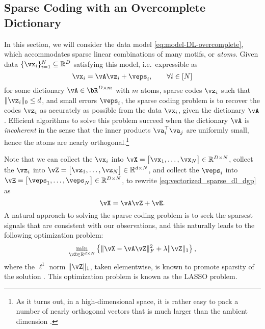 \documentclass[../../book-main.tex]{subfiles}
\begin{document}
\subsection{Sparse Coding with an Overcomplete Dictionary} 

In this section, we will consider the data model
\eqref{eq:model-DL-overcomplete}, which accommodates sparse linear combinations
of many motifs, or \textit{atoms}. Given data \(\{\vx_{i}\}_{i = 1}^{N} \subseteq
\R^{D}\) satisfying this model, i.e.\ expressible as
\begin{equation}\label{eq:vectorized_sparse_dl_dgp}
    \vx_{i} = \vA\vz_{i} + \veps_{i}, \qquad \forall i \in [N]
\end{equation}
for some dictionary $\vA \in \bR^{D \times m}$ with $m$ atoms, sparse codes
$\vz_i$ such that $\norm{\vz_i}_0 \leq d$, and small errors $\veps_i$,
the sparse coding problem is to recover the codes $\vz_i$ as accurately as
possible from the data $\vx_i$, given the dictionary $\vA$.
Efficient algorithms to solve this problem succeed when
the dictionary \(\vA\) is \textit{incoherent} in the sense that the inner
products \(\va_{i}^{\top}\va_{j}\) are uniformly small, hence the atoms are
nearly orthogonal.\footnote{As it turns out, in a high-dimensional space, it is
rather easy to pack a number of nearly orthogonal vectors that is much larger
than the ambient dimension \cite{Wright-Ma-2022}. } 


Note that we can collect the \(\vx_{i}\) into \(\vX = \mat{\vx_{1}, \dots, \vx_{N}} \in \R^{D \times N}\), collect the \(\vz_{i}\) into \(\vZ = \mat{\vz_{1}, \dots, \vz_{N}} \in \R^{d  \times N}\), and collect the \(\veps_{i}\) into \(\vE = \mat{\veps_{1}, \dots, \veps_{N}} \in \R^{D \times N}\), to rewrite \eqref{eq:vectorized_sparse_dl_dgp} as 
\begin{equation}\label{eq:sparse_dl_dgp}
    \vX = \vA\vZ + \vE.
\end{equation}
A natural approach to solving the sparse coding problem is to seek the sparsest
signals that are consistent with our observations, and this naturally leads to
the following optimization problem:
\begin{equation}\label{eq:sparse_dl_lasso}
    \min_{\vZ \in \R^{d \times N}}\bc{\norm{\vX - \vA\vZ}_{F}^{2} + \lambda \norm{\vZ}_{1}},
\end{equation}
where the \(\ell^1\) norm \(\norm{\vZ}_{1}\), taken elementwise, is known to promote sparsity of the solution \cite{Wright-Ma-2022}. 
This optimization problem is known as the LASSO problem. 
\end{document}
